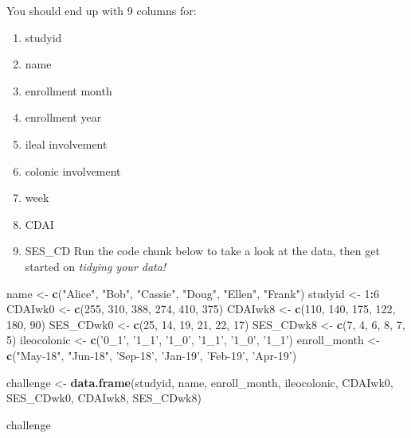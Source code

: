 \documentclass[
]{book}
\newenvironment{Shaded}{\begin{snugshade}}{\end{snugshade}}
\newcommand{\DecValTok}[1]{\textcolor[rgb]{0.00,0.00,0.81}{#1}}
\newcommand{\KeywordTok}[1]{\textcolor[rgb]{0.13,0.29,0.53}{\textbf{#1}}}
\newcommand{\NormalTok}[1]{#1}
\newcommand{\OperatorTok}[1]{\textcolor[rgb]{0.81,0.36,0.00}{\textbf{#1}}}
\newcommand{\StringTok}[1]{\textcolor[rgb]{0.31,0.60,0.02}{#1}}
\providecommand{\tightlist}{%
  \setlength{\itemsep}{0pt}\setlength{\parskip}{0pt}}
\begin{document}
You should end up with 9 columns for:

\begin{enumerate}
\def\labelenumi{\arabic{enumi}.}
\tightlist
\item
  studyid
\item
  name
\item
  enrollment month
\item
  enrollment year
\item
  ileal involvement
\item
  colonic involvement
\item
  week
\item
  CDAI
\item
  SES\_CD
  Run the code chunk below to take a look at the data, then get started on \emph{\emph{tidying your data!}}
\end{enumerate}

\begin{Shaded}
\begin{Highlighting}[]
\NormalTok{name <-}\StringTok{ }\KeywordTok{c}\NormalTok{(}\StringTok{"Alice"}\NormalTok{, }\StringTok{"Bob"}\NormalTok{, }\StringTok{"Cassie"}\NormalTok{, }\StringTok{"Doug"}\NormalTok{, }\StringTok{"Ellen"}\NormalTok{, }\StringTok{"Frank"}\NormalTok{)}
\NormalTok{studyid <-}\StringTok{ }\DecValTok{1}\OperatorTok{:}\DecValTok{6}
\NormalTok{CDAIwk0 <-}\StringTok{ }\KeywordTok{c}\NormalTok{(}\DecValTok{255}\NormalTok{, }\DecValTok{310}\NormalTok{, }\DecValTok{388}\NormalTok{, }\DecValTok{274}\NormalTok{, }\DecValTok{410}\NormalTok{, }\DecValTok{375}\NormalTok{)}
\NormalTok{CDAIwk8 <-}\StringTok{ }\KeywordTok{c}\NormalTok{(}\DecValTok{110}\NormalTok{, }\DecValTok{140}\NormalTok{, }\DecValTok{175}\NormalTok{, }\DecValTok{122}\NormalTok{, }\DecValTok{180}\NormalTok{, }\DecValTok{90}\NormalTok{)}
\NormalTok{SES_CDwk0 <-}\StringTok{ }\KeywordTok{c}\NormalTok{(}\DecValTok{25}\NormalTok{, }\DecValTok{14}\NormalTok{, }\DecValTok{19}\NormalTok{, }\DecValTok{21}\NormalTok{, }\DecValTok{22}\NormalTok{, }\DecValTok{17}\NormalTok{)}
\NormalTok{SES_CDwk8 <-}\StringTok{ }\KeywordTok{c}\NormalTok{(}\DecValTok{7}\NormalTok{, }\DecValTok{4}\NormalTok{, }\DecValTok{6}\NormalTok{, }\DecValTok{8}\NormalTok{, }\DecValTok{7}\NormalTok{, }\DecValTok{5}\NormalTok{)}
\NormalTok{ileocolonic <-}\StringTok{ }\KeywordTok{c}\NormalTok{(}\StringTok{'0_1'}\NormalTok{, }\StringTok{'1_1'}\NormalTok{, }\StringTok{'1_0'}\NormalTok{, }\StringTok{'1_1'}\NormalTok{, }\StringTok{'1_0'}\NormalTok{, }\StringTok{'1_1'}\NormalTok{)}
\NormalTok{enroll_month <-}\StringTok{ }\KeywordTok{c}\NormalTok{(}\StringTok{"May-18"}\NormalTok{, }\StringTok{"Jun-18"}\NormalTok{, }\StringTok{'Sep-18'}\NormalTok{, }\StringTok{'Jan-19'}\NormalTok{, }\StringTok{'Feb-19'}\NormalTok{, }\StringTok{'Apr-19'}\NormalTok{)}

\NormalTok{challenge <-}\StringTok{ }\KeywordTok{data.frame}\NormalTok{(studyid, name, enroll_month, ileocolonic, CDAIwk0, SES_CDwk0, CDAIwk8, SES_CDwk8)}

\NormalTok{challenge}
\end{Highlighting}
\end{Shaded}
\end{document}
